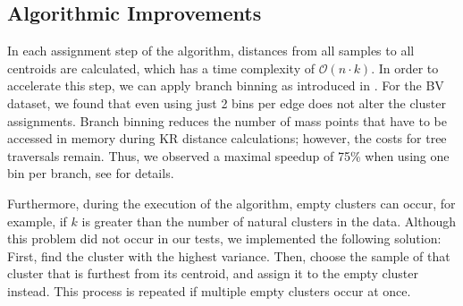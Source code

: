 
\subsection{Algorithmic Improvements}
\label{ch:Clustering:sec:PhylogeneticKmeans:sub:AlgorithmicImprovements}

In each assignment step of the algorithm, distances from all samples to all centroids are calculated,
which has a time complexity of $\mathcal{O}(n \cdot k)$.
In order to accelerate this step, we can apply branch binning
as introduced in .
For the \ac{BV} dataset, we found that even using just \num{2} bins per edge does not alter the cluster assignments.
Branch binning reduces the number of mass points that have to be accessed in memory during KR distance calculations;
however, the costs for tree traversals remain.
Thus, we observed a maximal speedup of 75\% when using one bin per branch,
see  for details.

Furthermore, during the execution of the algorithm, empty clusters can occur,
for example, if $k$ is greater than the number of natural clusters in the data.
Although this problem did not occur in our tests, we implemented the following solution:
First, find the cluster with the highest variance.
Then, choose the sample of that cluster that is furthest from its centroid,
and assign it to the empty cluster instead.
This process is repeated if multiple empty clusters occur at once.


